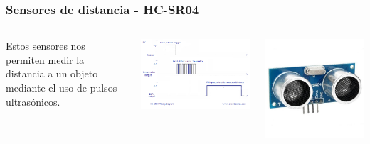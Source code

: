 \documentclass[compress]{beamer}
\begin{document}
\begin{frame}[fragile]
 \frametitle{Sensores de distancia - HC-SR04}
\begin{columns}
Estos sensores nos permiten medir la distancia a un objeto mediante el uso de pulsos ultrasónicos.
\begin{center}
 \includegraphics[width=1.0\columnwidth]{./img/hc-sr04-timing-diagram.png}
\end{center}
\begin{center}
 \includegraphics[width=1.0\columnwidth]{./img/hc-sr04.jpg}
\end{center}
\end{columns}
\end{frame}
\end{document}
